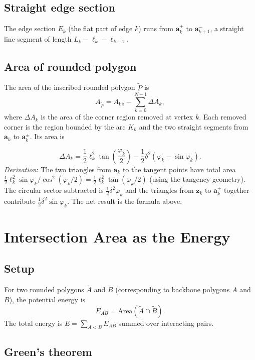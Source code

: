 \documentclass[12pt]{article}
\begin{document}
\subsection{Straight edge section}

The edge section $E_k$ (the flat part of edge $k$) runs from $\mathbf{a}_k^+$ to
$\mathbf{a}_{k+1}^-$, a straight line segment of length $L_k - \ell_k - \ell_{k+1}$.

\subsection{Area of rounded polygon}

The area of the inscribed rounded polygon $\tilde P$ is
\[
  A_{\tilde P} = A_{\mathrm{bb}} - \sum_{k=0}^{N-1} \Delta A_k,
\]
where $\Delta A_k$ is the area of the corner region removed at vertex $k$.  Each
removed corner is the region bounded by the arc $K_k$ and the two straight segments
from $\mathbf{a}_k$ to $\mathbf{a}_k^\pm$.  Its area is

\[
  \Delta A_k = \frac{1}{2}\ell_k^2 \tan\!\left(\frac{\varphi_k}{2}\right)
              - \frac{1}{2}\delta^2(\varphi_k - \sin\varphi_k).
\]
\emph{Derivation}: The two triangles from $\mathbf{a}_k$ to the tangent points
have total area $\frac{1}{2}\ell_k^2 \sin\varphi_k / \cos^2(\varphi_k/2)
= \frac{1}{2}\ell_k^2\tan(\varphi_k/2)$ (using the tangency geometry).
The circular sector subtracted is $\frac{1}{2}\delta^2\varphi_k$ and the triangles
from $\mathbf{z}_k$ to $\mathbf{a}_k^\pm$ together contribute $\frac{1}{2}\delta^2\sin\varphi_k$.
The net result is the formula above.

\section{Intersection Area as the Energy}

\subsection{Setup}

For two rounded polygons $\tilde A$ and $\tilde B$ (corresponding to backbone polygons
$A$ and $B$), the potential energy is
\[
  E_{AB} = \mathrm{Area}(\tilde A \cap \tilde B).
\]
The total energy is $E = \sum_{A < B} E_{AB}$ summed over interacting pairs.

\subsection{Green's theorem}
\end{document}
